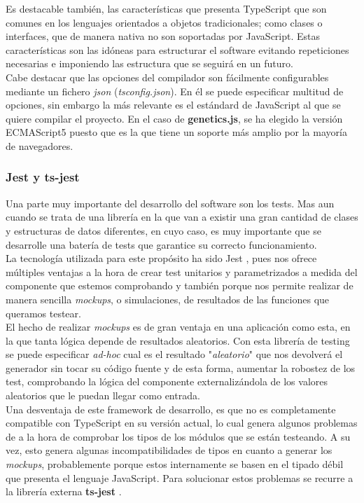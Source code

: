  Es destacable también, las características que presenta TypeScript que son comunes en los lenguajes orientados a objetos tradicionales; como clases o interfaces, que de manera nativa no son soportadas por JavaScript. Estas características son las idóneas para estructurar el software evitando repeticiones necesarias e imponiendo las estructura que se seguirá en un futuro. \\
 
 Cabe destacar que las opciones del compilador son fácilmente configurables mediante un fichero \textit{json} (\textit{tsconfig.json}). En él se puede especificar multitud de opciones, sin embargo la más relevante es el estándard de JavaScript al que se quiere compilar el proyecto. En el caso de \textbf{genetics.js}, se ha elegido la versión ECMAScript5 puesto que es la que tiene un soporte más amplio por la mayoría de navegadores.
 
\subsubsection{Jest y ts-jest}
 
 Una parte muy importante del desarrollo del software son los tests. Mas aun cuando se trata de una librería en la que van a existir una gran cantidad de clases y estructuras de datos diferentes, en cuyo caso, es muy importante que se desarrolle una batería de tests que garantice su correcto funcionamiento. \\
 
 La tecnología utilizada para este propósito ha sido Jest \cite{jest}, pues nos ofrece múltiples ventajas a la hora de crear test unitarios y parametrizados a medida del componente que estemos comprobando y también porque nos permite realizar de manera sencilla \textit{mockups}, o simulaciones, de resultados de las funciones que queramos testear. \\
 
 El hecho de realizar \textit{mockups} es de gran ventaja en una aplicación como esta, en la que tanta lógica depende de resultados aleatorios. Con esta librería de testing se puede especificar \textit{ad-hoc} cual es el resultado "\textit{aleatorio}" que nos devolverá el generador sin tocar su código fuente y de esta forma, aumentar la robostez de los test, comprobando la lógica del componente externalizándola de los valores aleatorios que le puedan llegar como entrada. \\
 
 Una desventaja de este framework de desarrollo, es que no es completamente compatible con TypeScript en su versión actual, lo cual genera algunos problemas de a la hora de comprobar los tipos de los módulos que se están testeando. A su vez, esto genera algunas incompatibilidades de tipos en cuanto a generar los \textit{mockups}, probablemente porque estos internamente se basen en el tipado débil que presenta el lenguaje JavaScript. Para solucionar estos problemas se recurre a la librería externa \textbf{ts-jest} \cite{tsjest}. \\
 
